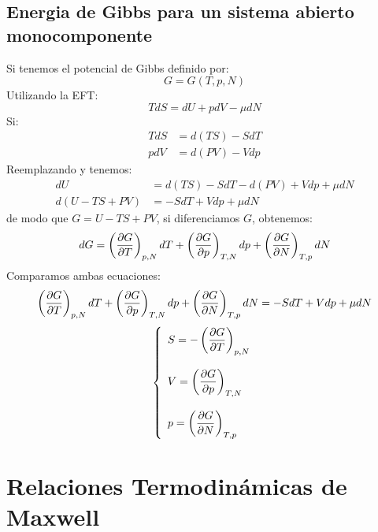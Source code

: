 \documentclass[../main]{subfiles}
\begin{document}
\section{Energia de Gibbs para un sistema abierto monocomponente}
Si tenemos el potencial de Gibbs definido por:
\begin{equation}
    G=G(T,p,N)
\end{equation}
Utilizando la EFT:
\begin{equation}
    TdS=dU+pdV-\mu dN
\end{equation}
Si:
\begin{align}
    TdS&=d(TS)-SdT \\
    pdV&=d(PV)-Vdp
\end{align}
Reemplazando y tenemos:
\begin{align}
    dU&=d(TS)-SdT-d(PV)+Vdp+\mu dN \\
    d(U-TS+PV)&=-SdT+Vdp+\mu dN
\end{align}
de modo que $G=U-TS+PV$, si diferenciamos $G$, obtenemos:
\begin{equation}
    dG=\left ( \pdv{G}{T}\right)_{p,N}dT+\left(\pdv{G}{p}\right)_{T,N}dp+\left( \pdv{G}{N}\right)_{T,p}dN
\end{equation}
Comparamos ambas ecuaciones:
\begin{equation}
    \left ( \pdv{G}{T}\right)_{p,N}dT+\left(\pdv{G}{p}\right)_{T,N}dp+\left( \pdv{G}{N}\right)_{T,p}dN=-SdT+Vdp+\mu dN
\end{equation}
\begin{equation}
    \left\{ 
    \begin{array}{l}
         S=\displaystyle -\left ( \pdv{G}{T}\right)_{p,N} \\ \\
         V=\displaystyle \left(\pdv{G}{p}\right)_{T,N} \\ \\
         p=\displaystyle \left( \pdv{G}{N}\right)_{T,p}
    \end{array} 
    \right. 
\end{equation}

\chapter{Relaciones Termodinámicas de Maxwell}
\end{document}
